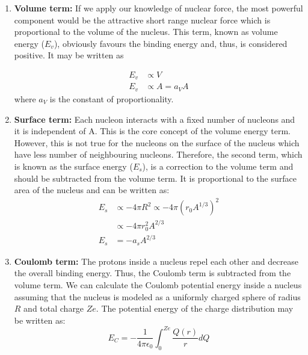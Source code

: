 \documentclass[ebook,12pt,oneside,openany]{memoir}
\begin{document}
\begin{enumerate}[label=\textbf{\Alph*.}]

    \item \textbf{Volume term:}     If we apply our knowledge of nuclear force, the most powerful component would be the attractive short range nuclear force which is proportional to the volume of the nucleus. This term, known as volume energy ($E_v$), obviously favours the binding energy and, thus, is considered positive. It may be written as
    
        \begin{equation}
            \begin{split}
                E_v &\propto V\\
                E_v &\propto A = a_VA
            \end{split}    
        \end{equation}
        \hspace{5em} where $a_V$ is the constant of proportionality.

    \item \textbf{Surface term:}    Each nucleon interacts with a fixed number of nucleons and it is independent of A. This is the core concept of the volume energy term. However, this is not true for the nucleons on the surface of the nucleus which have less number of neighbouring nucleons. Therefore, the second term, which is known as the surface energy ($E_s$), is a correction to the volume term and should be subtracted from the volume term. It is proportional to the surface area of the nucleus and can be written as:
        \begin{equation}
            \begin{split}
                E_s &\propto -4\pi R^2 \propto -4 \pi (r_0A^{1/3})^2\\&\propto -4 \pi r_0^2 A^{2/3}\\
                E_s &= -a_sA^{2/3}
            \end{split}
        \end{equation}
    
    \item \textbf{Coulomb term:}    The protons inside a nucleus repel each other and decrease the overall binding energy. Thus, the Coulomb term is subtracted from the volume term. We can calculate the Coulomb potential energy inside a nucleus assuming that the nucleus is modeled as a uniformly charged sphere of radius $R$ and total charge $Ze$.  The potential energy of the charge distribution may be written as:
        \begin{equation}
            E_C = -\frac{1}{4 \pi \epsilon_0}  \int_0^{Ze} \frac{Q(r)}{r}dQ
        \end{equation}
    

\end{enumerate}
\end{document}
